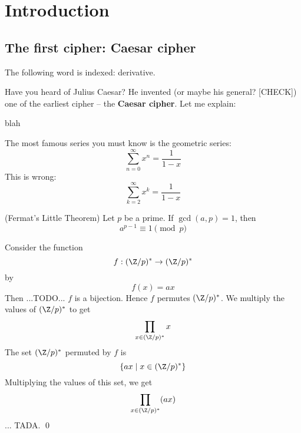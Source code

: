 \begin{comment}
  * Read the Washington in detail. You can use
  the web too. I have ordered lots of crypto
  books for the Stafford library.
  
  * For chapter 1, write several classical
  ciphers. Introduce main ideas without
  using number theory. You should mention the
  concept of key and to break a cipher means
  finding the key. There are several ciphers
  I covered and there are more in the book.
  Talk about "private key" cipher.
  Include examples.

  * Chapter 2: Basic number theory.
  Talk about divisibility, gcd, Euclidean
  algorithm, mod, Fermat, Euler.
  There are other results in Washington book.
  
  * Chapter 3: RSA 
\end{comment}
  

\makeindex
\renewcommand\TITLE{My CISS451 Book}
\renewcommand\AUTHOR{John Doe}
\renewcommand\SHORTAUTHOR{}


\topmatter

\chapter{Introduction}

\section{The first cipher: Caesar cipher}

The following word is indexed: 
derivative.

Have you heard of Julius Caesar?
He invented (or maybe his general? [CHECK])
one of
the earliest cipher -- the
\textbf{Caesar cipher}.
Let me explain:

blah

\newcommand\infsum[2]{\sum_{#1 = #2}^\infty}

The most famous series you must know is the
geometric series:
\[
\infsum{n}{0} x^n = \frac{1}{1 - x}
\]
This is wrong:
\[
\infsum{k}{2} x^k = \frac{1}{1 - x}
\]

\begin{thm} (Fermat's Little Theorem)
Let $p$ be a prime.
If $\gcd(a, p) = 1$, then
\[
a^{p - 1} \equiv 1 \pmod{p}
\]
\end{thm}

\proof
Consider the function
\[
f : (\Z/p)^* \rightarrow (\Z/p)^*
\]
by
\[
f(x) = ax
\]
Then ...TODO... $f$ is a bijection.
Hence $f$ permutes $(\Z/p)^*$.
We multiply the values of $(\Z/p)^*$ to get
\[
\prod_{x \in (\Z/p)^*} x
\]
The set $(\Z/p)^*$ permuted by $f$ is
\[ 
\{ ax \mid x \in (\Z/p)^*  \}
\]
Multiplying the values of this set, we get
\[
\prod_{x \in (\Z/p)^*} (ax)
\]
... TADA.
\qed



